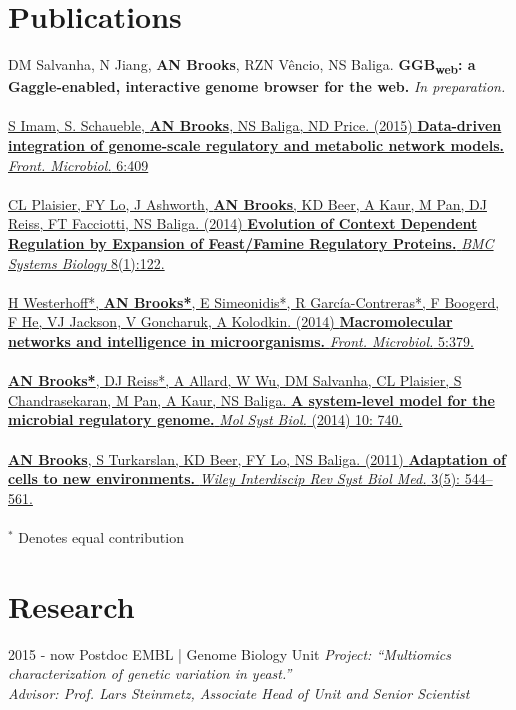 \documentclass[]{friggeri-cv}
\begin{document}
\section{Publications}
DM Salvanha, N Jiang, \textbf{AN Brooks}, RZN Vêncio, NS Baliga.
\textbf{GGB\textsubscript{web}: a Gaggle-enabled, interactive genome browser for the web.}
\emph{In preparation.}
\\
\\
\href{http://journal.frontiersin.org/article/10.3389/fmicb.2015.00409/abstract}{\noindent
S Imam, S. Schaueble,  \textbf{AN Brooks}, NS Baliga, ND Price. (2015)
\textbf{Data-driven integration of genome-scale regulatory and metabolic network models.}
\emph{Front. Microbiol.} 6:409
}
\\
\\
\href{http://www.biomedcentral.com/1752-0509/8/122}{\noindent
CL Plaisier, FY Lo, J Ashworth, \textbf{AN Brooks}, KD Beer, A Kaur, M Pan, DJ Reiss, FT Facciotti, NS Baliga. (2014)
\textbf{Evolution of Context Dependent Regulation by Expansion of Feast/Famine Regulatory Proteins.}
\emph{BMC Systems Biology} 8(1):122.
}
\\
\\
\href{http://journal.frontiersin.org/article/10.3389/fmicb.2014.00379/abstract}{\noindent
H Westerhoff*, \textbf{AN Brooks*}, E Simeonidis*, R García-Contreras*, F Boogerd, F He, VJ Jackson, V Goncharuk, A Kolodkin. (2014)
\textbf{Macromolecular networks and intelligence in microorganisms.}
\emph{Front. Microbiol.} 5:379. 
}
\\
\\
\href{http://msb.embopress.org/cgi/pmidlookup?view=long&pmid=25028489}{\noindent
\textbf{AN Brooks*}, DJ Reiss*, A Allard, W Wu, DM Salvanha, CL Plaisier, S Chandrasekaran, M Pan, A Kaur, NS Baliga.
\textbf{A system-level model for the microbial regulatory genome.}
\emph{Mol Syst Biol.} (2014) 10: 740.
}
\\
\\
\href{http://www.ncbi.nlm.nih.gov/pubmed/21197660}{\noindent
\textbf{AN Brooks}, S Turkarslan, KD Beer, FY Lo, NS Baliga. (2011)
\textbf{Adaptation of cells to new environments.}
\emph{Wiley Interdiscip Rev Syst Biol Med.} 3(5): 544–561.
}
\\
\\
$^{\ast}$ Denotes equal contribution

\section{Research}
\begin{entrylist}
  \entry
    {2015 - now}
    {Postdoc}
    {EMBL | Genome Biology Unit}
    {\emph{Project: ``Multiomics characterization of genetic variation in yeast.''}\\
    \emph{Advisor: Prof. Lars Steinmetz, Associate Head of Unit and Senior Scientist}\\}
\end{entrylist}
\end{document}
